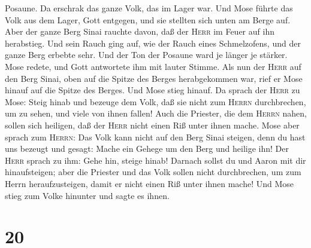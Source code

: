 Posaune. Da erschrak das ganze Volk, das im Lager war. 
Und Mose führte das Volk aus dem Lager, Gott entgegen, und sie stellten
sich unten am Berge auf.  Aber der ganze Berg Sinai
rauchte davon, daß der \textsc{Herr} im Feuer auf ihn herabstieg. Und
sein Rauch ging auf, wie der Rauch eines Schmelzofens, und der ganze
Berg erbebte sehr.  Und der Ton der Posaune ward je
länger je stärker. Mose redete, und Gott antwortete ihm mit lauter
Stimme.  Als nun der \textsc{Herr} auf den Berg Sinai,
oben auf die Spitze des Berges herabgekommen war, rief er Mose hinauf
auf die Spitze des Berges. Und Mose stieg hinauf.  Da
sprach der \textsc{Herr} zu Mose: Steig hinab und bezeuge dem Volk, daß
sie nicht zum \textsc{Herrn} durchbrechen, um zu sehen, und viele von
ihnen fallen!  Auch die Priester, die dem \textsc{Herrn}
nahen, sollen sich heiligen, daß der \textsc{Herr} nicht einen Riß unter
ihnen mache.  Mose aber sprach zum \textsc{Herrn}: Das
Volk kann nicht auf den Berg Sinai steigen, denn du hast uns bezeugt und
gesagt: Mache ein Gehege um den Berg und heilige ihn! 
Der \textsc{Herr} sprach zu ihm: Gehe hin, steige hinab! Darnach sollst
du und Aaron mit dir hinaufsteigen; aber die Priester und das Volk
sollen nicht durchbrechen, um zum Herrn heraufzusteigen, damit er nicht
einen Riß unter ihnen mache!  Und Mose stieg zum Volke
hinunter und sagte es ihnen.

\hypertarget{section-19}{%
\section{20}\label{section-19}}

